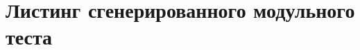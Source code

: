 \chapter{Листинг сгенерированного модульного теста} \label{app:B}

\begingroup
\captiondelim{ } %

\endgroup